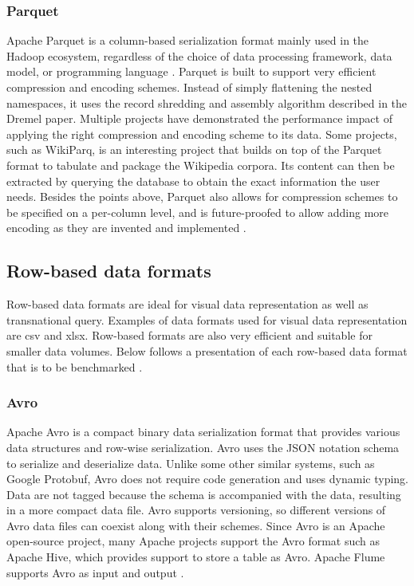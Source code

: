 \subsubsection{Parquet}
Apache Parquet is a column-based serialization format mainly used in the Hadoop ecosystem, regardless of the choice of data processing framework, data model, or programming language \cite{vohra_apache_2016}. Parquet is built to support very efficient compression and encoding schemes. Instead of simply flattening the nested namespaces, it uses the record shredding and assembly algorithm described in the Dremel paper\cite{36632}. Multiple projects have demonstrated the performance impact of applying the right compression and encoding scheme to its data. Some projects, such as WikiParq, is an interesting project that builds on top of the Parquet format to tabulate and package the Wikipedia corpora\cite{klang_wikiparq_2016}. Its content can then be extracted by querying the database to obtain the exact information the user needs. Besides the points above, Parquet also allows for compression schemes to be specified on a per-column level, and is future-proofed to allow adding more encoding as they are invented and implemented \cite{vohra_apache_2016, cao_data_2017}.

\subsection{Row-based data formats}
Row-based data formats are ideal for visual data representation as well as transnational query. Examples of data formats used for visual data representation are csv and xlsx. Row-based formats are also very efficient and suitable for smaller data volumes. Below follows a presentation of each row-based data format that is to be benchmarked \cite{vohra_apache_2016_avro, cao_data_2017}.

\subsubsection{Avro}
Apache Avro is a compact binary data serialization format that provides various data structures and row-wise serialization\cite{vohra_apache_2016_avro}. Avro uses the JSON notation schema to serialize and deserialize data. Unlike some other similar systems, such as Google Protobuf, Avro does not require code generation and uses dynamic typing. Data are not tagged because the schema is accompanied with the data, resulting in a more compact data file. Avro supports versioning, so different versions of Avro data files can coexist along with their schemes. Since Avro is an Apache open-source project, many Apache projects support the Avro format such as Apache Hive, which provides support to store a table as Avro. Apache Flume supports Avro as input and output \cite{vohra_apache_2016, vohra_apache_2016_avro, cao_data_2017}. 

